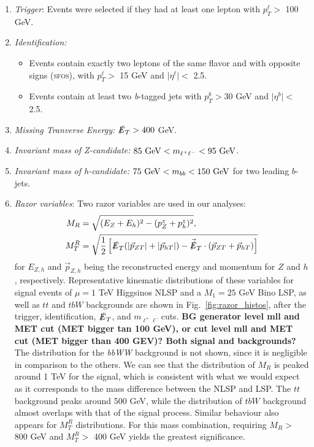 \documentclass[a4paper,11pt]{article}
\providecommand{\tightlist}{%
     \setlength{\itemsep}{0pt}\setlength{\parskip}{0pt}}
\newcommand{\Shufang}[1]{{\bf\color{Maroon}  #1}}
\newcommand{\met}{{\slashed{E}_T}}
\begin{document}
\begin{enumerate}
  \tightlist
  \item \emph{Trigger}: Events were selected if they had at least one lepton
    with $p_{T}^\ell >$ 100 GeV. 

  \item \emph{Identification:}

    \begin{itemize}
      \item Events contain exactly two leptons of the same flavor
        and with opposite signs (\textsc{sfos}), with $p_{T}^\ell >$ 15 GeV and
        $\vert\eta^\ell\vert <$ 2.5.
      \item Events contain at least two \emph{b}-tagged jets with
        $p_{T}^b > 30$ GeV and $\vert\eta^b\vert <$ 2.5.
    \end{itemize}

   \item \emph{Missing Tranverse Energy:}  $\met> 400$ GeV.

 \item \emph{Invariant mass of Z-candidate:}  $85\ {\rm GeV}<m_{\ell^{+}\ell^{-}}<95\ {\rm GeV}$.

  \item \emph{Invariant mass of h-candidate:} $75\ {\rm GeV}<m_{bb}<150\ {\rm GeV}$ for two leading $b$-jets.


  \item \emph{Razor variables}:  Two razor variables are used in our analyses: 
\begin{align}
M_R &= \sqrt{(E_Z+E_h)^2 - (p_Z^z + p_h^z)^2},\\
M_T^R &= \sqrt{\frac{1}{2}\left[\slashed{E}_T(|\vec{p}_{ZT}|+|\vec{p}_{hT}|)
- \vec{\slashed{E}}_T\cdot(\vec{p}_{ZT}+\vec{p}_{hT})\right]}
\end{align}
 for $E_{Z,h}$ and $\vec{p}_{Z,h}$ being the reconstructed energy and momentum for $Z$ and $h$, respectively.
      Representative kinematic
  distributions of these variables for signal events of $\mu=1$ TeV Higgsinos
  NLSP and a $M_1=25$ GeV Bino LSP, as well as $tt$ and $tbW$ backgrounds are
  shown in Fig.~\ref{fig:razor_histos}, after the trigger, identification,
  $\slashed{E}_{T}$,  and  $m_{\ell^+\ell^-}$cuts.   
  \Shufang{BG generator level mll and MET cut (MET bigger tan 100 GeV), or cut
    level mll and MET cut (MET bigger than 400 GEV)? Both signal and
  backgrounds?} The
  distribution for the \emph{bbWW} background is not shown, since it is negligible in
  comparison to the others.   We can see that the distribution of $M_R$ is peaked
  around 1 TeV for the signal, which is consistent with what we would expect as
  it corresponds to the mass difference between the NLSP and LSP.  The $tt$
  background peaks around 500 GeV, while the distribution of $tbW$ background
  almost overlaps with that of the signal process.  Similar behaviour also
  appears for $M_T^R$ distributions.  
  For this mass combination, requiring $M_R >$ 800
  GeV and $M_T^R >$ 400 GeV yields the greatest significance.

\end{enumerate}
\end{document}
